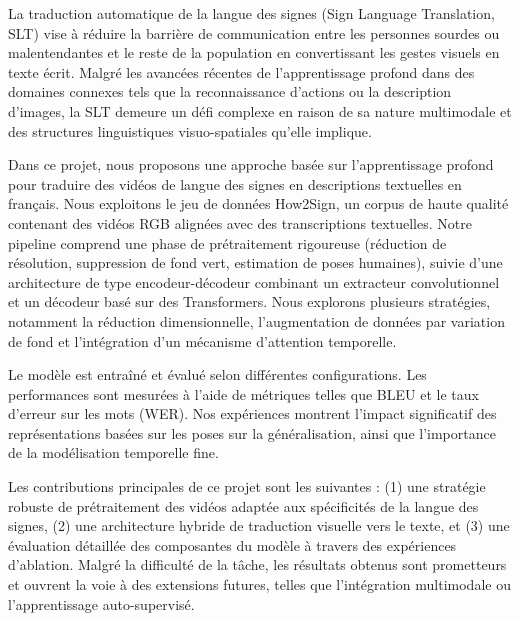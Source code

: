 La traduction automatique de la langue des signes (Sign Language Translation, SLT) vise à réduire la barrière de communication entre 
les personnes sourdes ou malentendantes et le reste de la population en convertissant les gestes visuels en texte écrit. 
Malgré les avancées récentes de l’apprentissage profond dans des domaines connexes tels que la reconnaissance d’actions ou 
la description d’images, la SLT demeure un défi complexe en raison de sa nature multimodale et des structures linguistiques 
visuo-spatiales qu’elle implique.

Dans ce projet, nous proposons une approche basée sur l’apprentissage profond pour traduire des vidéos de langue des signes en descriptions 
textuelles en français. Nous exploitons le jeu de données How2Sign, un corpus de haute qualité contenant des vidéos RGB alignées avec des 
transcriptions textuelles. Notre pipeline comprend une phase de prétraitement rigoureuse (réduction de résolution, suppression de fond vert, 
estimation de poses humaines), suivie d’une architecture de type encodeur-décodeur combinant un extracteur convolutionnel et un décodeur basé 
sur des Transformers. 
Nous explorons plusieurs stratégies, notamment la réduction dimensionnelle, l’augmentation de données par variation de fond et l’intégration 
d’un mécanisme d’attention temporelle.

Le modèle est entraîné et évalué selon différentes configurations. Les performances sont mesurées à l’aide de métriques telles que BLEU 
et le taux d’erreur sur les mots (WER). Nos expériences montrent l’impact significatif des représentations basées sur les poses sur la généralisation, 
ainsi que l’importance de la modélisation temporelle fine.

Les contributions principales de ce projet sont les suivantes : (1) une stratégie robuste de prétraitement des vidéos adaptée aux spécificités 
de la langue des signes, (2) une architecture hybride de traduction visuelle vers le texte, et (3) une évaluation détaillée des composantes du 
modèle à travers des expériences d’ablation. Malgré la difficulté de la tâche, les résultats obtenus sont prometteurs et ouvrent la voie à des 
extensions futures, telles que l’intégration multimodale ou l’apprentissage auto-supervisé.
